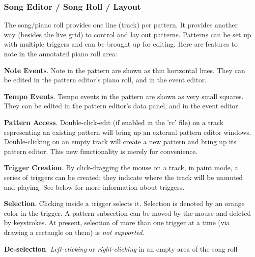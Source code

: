 \subsubsection{Song Editor / Song Roll / Layout}
\label{subsubsec:song_editor_song_roll_layout}

   The song/piano roll provides one line (track) per pattern.
   It provides another way (besides the live grid) to control
   and lay out patterns.
   Patterns can be set up with multiple triggers and can be
   brought up for editing.
   Here are features to note in the annotated piano roll area:

   \begin{enumber}
      \item \textbf{Note Events}.
         Note in the pattern are shown as thin horizontal lines.
         They can be edited in the pattern editor's piano roll,
         and in the event editor.
      \item \textbf{Tempo Events}.
         Tempo events in the pattern are shown as very small squares.
         They can be edited in the pattern editor's data panel,
         and in the event editor.
      \item \textbf{Pattern Access}.
         Double-click-edit (if enabled in the 'rc' file) on a track
         representing an existing pattern will bring up an external
         pattern editor windows.
         Double-clicking on an empty track will create a new pattern
         and bring up its pattern editor.
         This new functionality is merely for convenience.
      \item \textbf{Trigger Creation}.
         By click-dragging the mouse on a track, in paint mode,
         a series of triggers can be
         created; they indicate where the track will be unmuted and playing.
         See below for more information about triggers.
      \item \textbf{Selection}.
         Clicking inside a trigger selects it.
         Selection is denoted by
         an orange color in the trigger.
         A pattern subsection can be moved by the mouse and deleted by
         keystrokes.
         At present, selection of more than one trigger at a time (via
         drawing a rectangle on them) is \textsl{not supported}.
      \item \textbf{De-selection}.
         \textsl{Left-clicking} or \textsl{right-clicking} in
         an empty area of the song roll

\end{enumber}
